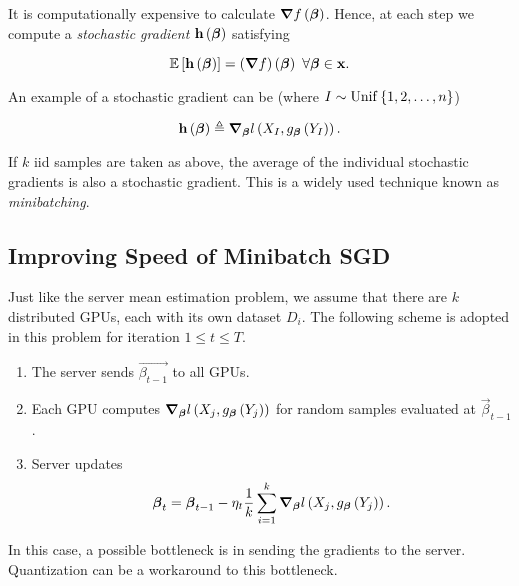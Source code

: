 \documentclass[twoside]{article}
\begin{document}
It is computationally expensive to calculate
\(\boldsymbol{\mathbf{\nabla}}f\left(\boldsymbol{\mathbf{\beta}}\right)\). Hence, at each step we compute a
\emph{stochastic gradient} \(\boldsymbol{\mathbf{h}}\left(\boldsymbol{\mathbf{\beta}}\right)\) satisfying

\begin{equation}
    \mathbb{E}\left[ \boldsymbol{\mathbf{h}}\left(\boldsymbol{\mathbf{\beta}}\right) \right] = \left(\boldsymbol{\mathbf{\nabla}}f\right)\left(\boldsymbol{\mathbf{\beta}}\right)\ \forall \boldsymbol{\mathbf{\beta}} \in \boldsymbol{\mathbf{x}}.
    \label{eq:stoc-grad-cond}
\end{equation}

An example of a stochastic gradient can be (where
\(I\sim\mathrm{Unif}\left\{1,2,\ldots,n\right\}\))

\begin{equation}
    \boldsymbol{\mathbf{h}}\left(\boldsymbol{\mathbf{\beta}}\right) \triangleq \boldsymbol{\mathbf{\nabla}}_{\boldsymbol{\mathbf{\beta}}}l\left(X_I, g_{\boldsymbol{\mathbf{\beta}}}\left(Y_I\right)\right).
    \label{eq:single-stoc-grad}
\end{equation}

If \(k\) iid samples are taken as above, the average of the individual
stochastic gradients is also a stochastic gradient. This is a widely used
technique known as \emph{minibatching}.

\subsection{Improving Speed of Minibatch SGD}

Just like the server mean estimation problem, we assume that there are \(k\)
distributed GPUs, each with its own dataset \(D_i\). The following scheme is
adopted in this problem for iteration \(1 \le t \le T\).

\begin{enumerate}
    \item The server sends \(\vec{\beta_{t-1}}\) to all GPUs.
    \item Each GPU computes \(\boldsymbol{\mathbf{\nabla}}_{\boldsymbol{\mathbf{\beta}}}l\left(X_j,
    g_{\boldsymbol{\mathbf{\beta}}}\left(Y_j\right)\right)\) for random samples evaluated at
    \(\vec{\beta}_{t-1}\).
    \item Server updates
        \begin{equation}
            \boldsymbol{\mathbf{\beta}}_t = \boldsymbol{\mathbf{\beta}}_{t-1} - \eta_t\frac{1}{k}\sum_{i=1}^k \boldsymbol{\mathbf{\nabla}}_{\boldsymbol{\mathbf{\beta}}}l\left(X_j, g_{\boldsymbol{\mathbf{\beta}}}\left(Y_j\right)\right).
            \label{eq:srv-update}
        \end{equation}
\end{enumerate}

In this case, a possible bottleneck is in sending the gradients to the server.
Quantization can be a workaround to this bottleneck.
\end{document}
